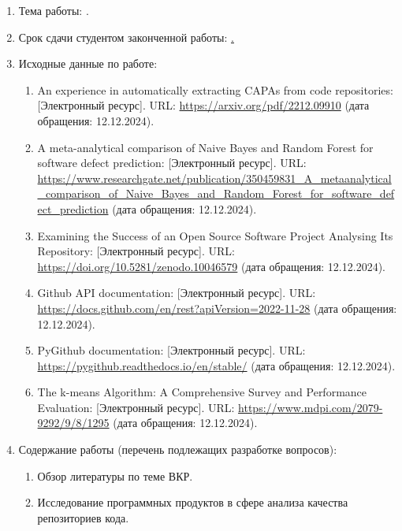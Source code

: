 \begin{enumerate}[1.]
\item Тема работы: {\expandafter \thesisTitle.}
\item Срок сдачи студентом законченной работы: \uline{\thesisDeadline.} 
\item Исходные данные по работе: \begin{enumerate}[label=\theenumi\arabic*.]
	\item An experience in automatically extracting CAPAs from code repositories: [Электронный ресурс]. URL: \url{https://arxiv.org/pdf/2212.09910} (дата обращения: 12.12.2024).
	\item A meta-analytical comparison of Naive Bayes and Random Forest for software defect prediction: [Электронный ресурс]. URL: \url{https://www.researchgate.net/publication/350459831_A_metaanalytical_comparison_of_Naive_Bayes_and_Random_Forest_for_software_defect_prediction} (дата обращения: 12.12.2024).
	\item Examining the Success of an Open Source Software Project Analysing Its Repository: [Электронный ресурс]. URL: \url{https://doi.org/10.5281/zenodo.10046579} (дата обращения: 12.12.2024).
	\item Github API documentation: [Электронный ресурс]. URL: \url{https://docs.github.com/en/rest?apiVersion=2022-11-28} (дата обращения: 12.12.2024).
	\item PyGithub documentation: [Электронный ресурс]. URL: \url{https://pygithub.readthedocs.io/en/stable/} (дата обращения: 12.12.2024).
	\item The k-means Algorithm: A Comprehensive Survey and Performance Evaluation: [Электронный ресурс]. URL: \url{https://www.mdpi.com/2079-9292/9/8/1295} (дата обращения: 12.12.2024).
\end{enumerate}
\printbibliographyTask %
\item Содержание работы (перечень подлежащих разработке вопросов):
\begin{enumerate}[label=\theenumi\arabic*.]
\item Обзор литературы по теме ВКР.
\item Исследование программных продуктов в сфере анализа качества репозиториев кода.

\end{enumerate}
\end{enumerate}

